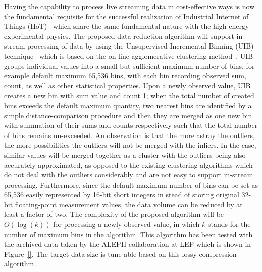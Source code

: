 Having the capability to process live streaming data in cost-effective ways is now the fundamental requisite for the successful realization of Industrial Internet of Things (IIoT)~\cite{} which share the same fundamental nature with the high-energy experimental physics. The proposed data-reduction algorithm will support in-stream processing of data by using the Unsupervised Incremental Binning (UIB) technique~\cite{} which is based on the on-line agglomerative clustering method~\cite{}. UIB groups individual values into a small but sufficient maximum number of bins, for example default maximum 65,536 bins, with each bin recording observed sum, count, as well as other statistical properties. Upon a newly observed value, UIB creates a new bin with sum value and count 1; when the total number of created bins exceeds the default maximum quantity, two nearest bins are identified by a simple distance-comparison procedure and then they are merged as one new bin with summation of their sums and counts respectively such that the total number of bins remains un-exceeded. An observation is that the more astray the outliers, the more possibilities the outliers will not be merged with the inliers. In the case, similar values will be merged together as a cluster with the outliers being also accurately approximated, as opposed to the existing clustering algorithms which do not deal with the outliers considerably and are not easy to support in-stream processing. Furthermore, since the default maximum number of bins can be set as 65,536 easily represented by 16-bit short integers in stead of storing original 32-bit floating-point measurement values, the data volume can be reduced by at least a factor of two.  The complexity of the proposed algorithm will be $O(\log(k))$ for processing a newly observed value, in which $k$ stands for the number of maximum bins in the algorithm. This algorithm has been tested with the archived data taken by the ALEPH collaboration at LEP which is shown in Figure~\ref{}. The target data size is tune-able based on this lossy compression algorithm.







